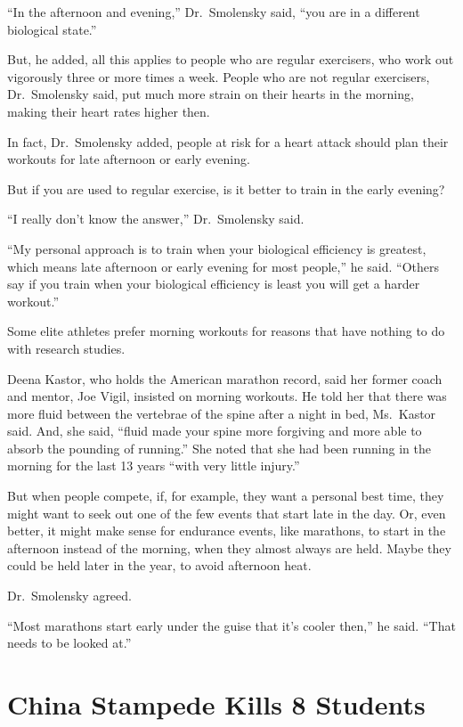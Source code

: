 ﻿\documentclass[12pt]{article}
\begin{document}
``In the afternoon and evening,'' Dr.~Smolensky said, ``you are in a different biological state.''

But, he added, all this applies to people who are regular exercisers, who work out vigorously three
or more times a week. People who are not regular exercisers, Dr.~Smolensky said, put much more
strain on their hearts in the morning, making their heart rates higher then.

In fact, Dr.~Smolensky added, people at risk for a heart attack should plan their workouts for late
afternoon or early evening.

But if you are used to regular exercise, is it better to train in the early evening?

``I really don't know the answer,'' Dr.~Smolensky said.

``My personal approach is to train when your biological efficiency is greatest, which means late
afternoon or early evening for most people,'' he said. ``Others say if you train when your
biological efficiency is least you will get a harder workout.''

Some elite athletes prefer morning workouts for reasons that have nothing to do with research
studies.

Deena Kastor, who holds the American marathon record, said her former coach and mentor, Joe Vigil,
insisted on morning workouts. He told her that there was more fluid between the vertebrae of the
spine after a night in bed, Ms.~Kastor said. And, she said, ``fluid made your spine more forgiving
and more able to absorb the pounding of running.'' She noted that she had been running in the
morning for the last 13 years ``with very little injury.''

But when people compete, if, for example, they want a personal best time, they might want to seek
out one of the few events that start late in the day. Or, even better, it might make sense for
endurance events, like marathons, to start in the afternoon instead of the morning, when they almost
always are held. Maybe they could be held later in the year, to avoid afternoon heat.

Dr.~Smolensky agreed.

``Most marathons start early under the guise that it's cooler then,'' he said. ``That needs to be
looked at.''

\section{China Stampede Kills 8 Students }
\end{document}
